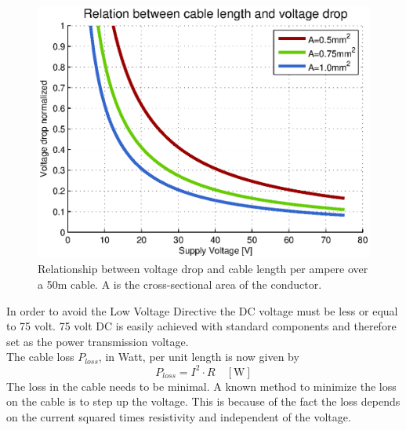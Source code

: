 \begin{figure}[hbtp]
\centering
\includegraphics[scale=1]{graphics/matlab/cable_relation_voltage_drop.eps}
\caption[Relationship between voltage drop and cable length per ampere]{Relationship between voltage drop and cable length per ampere over a 50m cable. A is the cross-sectional area of the conductor.}
\label{fig:relation_voltage_drop}
\end{figure}

\noindent
In order to avoid the Low Voltage Directive \cite{Parliament2006} the DC voltage must be less or equal to 75 volt. 75 volt DC is easily achieved with standard components and therefore set as the power transmission voltage. \\

\noindent
The cable loss $P_{loss}$, in Watt, per unit length is now given by
\begin{equation}
P_{loss} = I^2 \cdot R \quad [\mathrm{W}]
\end{equation}
\noindent
The loss in the cable needs to be minimal. A known method to minimize the loss on the cable is to step up the voltage. This is because of the fact the loss depends on the current squared times resistivity and independent of the voltage. 


